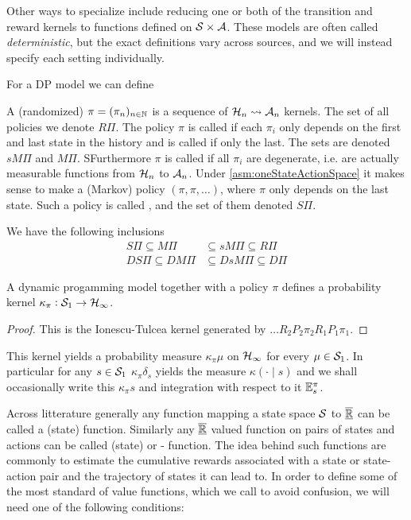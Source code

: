 Other ways to specialize include reducing one or both of the
transition and reward kernels to functions defined on
$\mathcal{S} \times \mathcal{A}$. These models are often called
\emph{deterministic}, but the exact definitions vary across sources, and we will
instead specify each setting individually.


For a DP model we can define
\begin{defn}[Policy]
  A (randomized)  $\pi = (\pi_n)_{n \in \mathbb{N}}$
  is a sequence of $\mathcal{H}_n \leadsto \mathcal{A}_n$ kernels.
  The set of all policies we denote $R\Pi$.
  The policy $\pi$ is called  if each $\pi_i$ only depends
  on the first and last state in the history
  and is called  if only the last.
  The sets are denoted $sM\Pi$ and $M\Pi$.
 SFurthermore $\pi$ is called  if all $\pi_i$
  are degenerate, i.e. are actually measurable functions from
  $\mathcal{H}_n$ to $\mathcal{A}_n$. 
  Under \cref{asm:oneStateActionSpace}
  it makes sense to make a (Markov) policy $(\pi, \pi, \dots)$,
  where $\pi$ only depends on the last state.
  Such a policy is called ,
  and the set of them denoted $S\Pi$.
\end{defn}
We have the following inclusions
\begin{align*}
  S\Pi \subseteq M\Pi &\subseteq sM\Pi \subseteq R\Pi
  \\ DS\Pi \subseteq DM\Pi &\subseteq DsM\Pi \subseteq D\Pi
\end{align*}

\begin{prop}
A dynamic progamming model together with a policy $\pi$ defines a
probability kernel $\kappa_\pi : \mathcal{S}_1 \to \mathcal{H}_\infty$.
\end{prop}
\begin{proof}
  This is the Ionescu-Tulcea kernel generated by
  $\dots R_2 P_2 \pi_2 R_1 P_1 \pi_1$.
\end{proof}
This kernel yields a probability measure $\kappa_\pi \mu$ on $\mathcal{H}_\infty$
for every $\mu \in \mathcal{S}_1$. In particular for any $s \in \mathcal{S}_1$
$\kappa_\pi \delta_s$ yields the measure $\kappa(\cdot \mid s)$
and we shall occasionally write this $\kappa_\pi s$ and
integration with respect to it $\mathbb{E}^\pi_s$.

Across litterature generally %
any function mapping a state space $\mathcal{S}$ to $\overline{\underline{\mathbb{R}}}$
can be called a (state)
 function. Similarly any $\underline{\overline{\mathbb{R}}}$ valued function
on pairs of states and actions can be called (state)
 or - function.
The idea behind such functions are commonly to estimate the
cumulative rewards associated with a state or state-action pair
and the trajectory of states it can lead to.
In order to define some of the most standard of value functions,
which we call  to avoid confusion, we will need one of
the following conditions:

